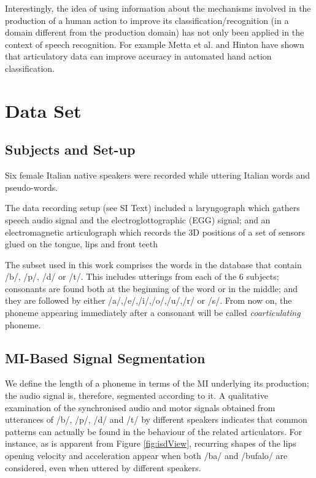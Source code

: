 \documentclass{pnastwo}
\begin{document}
\begin{article}
Interestingly, the idea of using information about the mechanisms involved in the production of a human action to improve its classification/recognition (in a domain different from the production domain) has not only been applied in the context of speech recognition. For example Metta et al. \cite{metta-06} and Hinton \cite{hinton-2006} 
have shown that articulatory data can improve accuracy in automated hand action classification.

\section{Data Set}
\label{sec:dataset}

\subsection{Subjects and Set-up}
\label{subsec:setup}

Six female Italian native speakers were recorded while uttering
Italian words and pseudo-words.

The data recording setup (see SI Text) included a laryngograph which
gathers speech audio signal and the electroglottographic (EGG) 
signal; and an electromagnetic articulograph which records the
3D positions of a set of sensors glued on the tongue, lips and front teeth

The subset used in this work comprises the words in the database
that contain /b/, /p/, /d/ or /t/. This includes utterings from each of the
$6$ subjects; consonants are found both at the beginning of the word or
in the middle; and they are followed by either /a/,/e/,/i/,/o/,/u/,/r/ or /s/.
From now on, the phoneme appearing immediately after a consonant will be called
\emph{coarticulating} phoneme.

\subsection{MI-Based Signal Segmentation}
\label{subsec:segm}

We define the length of a phoneme in terms of the MI underlying its production;
the audio signal is, therefore, segmented according to it.
A qualitative examination of the synchronised audio and motor
signals obtained from utterances of /b/, /p/, /d/ and /t/
by different speakers indicates that common patterns can
actually be found in the behaviour of the related articulators.
For instance, as is apparent from Figure \ref{fig:isdView}, 
recurring shapes of the lips opening velocity and acceleration appear
when both /ba/ and /bufalo/ are considered, even when uttered by different
speakers. 


\end{article}
\end{document}
